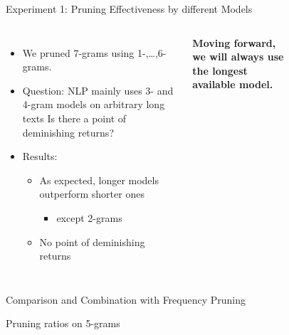 \documentclass[16:9,en,navbarinfooter]{sdqbeamer}
\begin{document}
\begin{frame}{Experiment 1: Pruning Effectiveness by different Models}
\begin{columns}

    \begin{itemize}
        \item We pruned 7-grams using 1-,\ldots,6-grams.
        \item Question: NLP mainly uses 3- and 4-gram models on arbitrary long texts
            Is there a point of deminishing returns?
        \item Results:
            \begin{itemize}
                \item As expected, longer models outperform shorter ones
                    \begin{itemize}
                        \item except 2-grams
                    \end{itemize}
                \item No point of deminishing returns
            \end{itemize}
    \end{itemize}
    \textbf{Moving forward, we will always use the longest available model.}

    \vspace{1cm}
    \begin{figure}[H]
    
    \end{figure}
\end{columns}
\end{frame}

\begin{frame}[fragile]{Comparison and Combination with Frequency Pruning}
\vspace{1cm}
    \begin{center}
    Pruning ratios on 5-grams
    \end{center}
\centering%

\end{frame}
\end{document}

